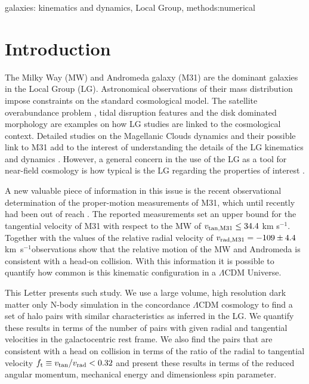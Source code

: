 \documentclass{emulateapj}
\newcommand{\kms}{\,km~s$^{-1}$}
\begin{document}
\begin{keywords}
{galaxies: kinematics and dynamics, Local Group, methods:numerical}
\end{keywords}

\section{Introduction}

The Milky Way (MW) and Andromeda galaxy (M31) are the dominant
galaxies in the Local Group (LG). Astronomical observations of their
mass distribution impose constraints on the standard cosmological
model. The satellite overabundance problem \citep{Klypin99,Moore99},
tidal disruption features \citep{pandas09} and the disk dominated
morphology \citep{Kazantzidis2008} are examples on how LG studies
are linked to the cosmological context. Detailed studies on the
Magellanic Clouds dynamics and their possible link to M31 add to the
interest of understanding the details of the LG kinematics and
dynamics
\citep{Besla2007,Tollerud2011,Knebe2011,Fouquet2012,Teyssier2012}. However,
a general concern in the use of the LG as a tool for near-field
cosmology \citep{Freeman2002,Peebles2010} is how typical is the LG
regarding the properties of interest
\citep{Busha2011,Liu2011,ForeroRomero2011,Purcell2012}.  

A new valuable piece of information in this issue is the recent
observational determination of the proper-motion measurements of M31,
which until recently had been out of reach \citep{vanderMarel12}.  The
reported measurements set an upper bound for the tangential velocity
of M31 with respect to the MW of $v_{\rm tan,M31}\leq 34.4$ km
s$^{-1}$. Together with the values of the relative radial velocity of
$v_{\rm rad,M31}=-109\pm 4.4$ \kms observations show that the relative
motion of the MW and Andromeda is consistent with a head-on
collision. With this information it is possible to quantify how common
is this kinematic configuration in a $\Lambda$CDM Universe. 

This Letter presents such study. We use a large volume, high resolution
dark matter only N-body simulation in the concordance $\Lambda$CDM
cosmology to find a set of halo pairs with similar  characteristics as
inferred in the LG. We quantify these results in terms of the number
of pairs with given radial and tangential velocities in the
galactocentric rest frame. We also find the pairs that are consistent
with a head on collision in terms of the ratio of the radial to
tangential velocity $f_{\rm t}\equiv v_{\rm tan}/v_{\rm rad}<0.32$ and
present these results in terms of the reduced angular momentum,
mechanical energy and dimensionless spin parameter.
\end{document}
